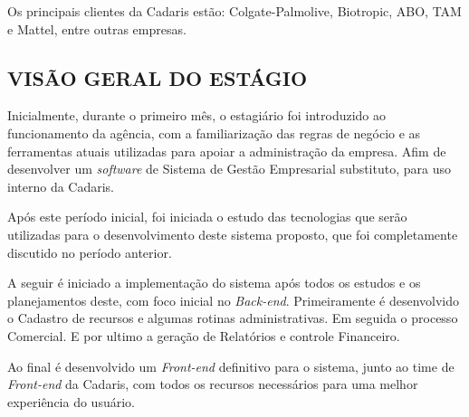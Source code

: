 \documentclass[
  12pt,				%
  openany,
  oneside,
  a4paper,			%
  english,			%
  brazil
]{article}
\numberwithin{figure}{section}
\numberwithin{table}{section}
\begin{document}
Os principais clientes da Cadaris estão: Colgate-Palmolive, Biotropic, ABO, TAM e Mattel, entre outras empresas.



\subsection{VISÃO GERAL DO ESTÁGIO}


Inicialmente, durante o primeiro mês, o estagiário foi introduzido ao funcionamento da agência, com a familiarização das regras de negócio e as ferramentas atuais utilizadas para apoiar a administração da empresa. Afim de desenvolver um \textit{software} de Sistema de Gestão Empresarial substituto, para uso interno da Cadaris.

Após este período inicial, foi iniciada o estudo das tecnologias que serão utilizadas para o desenvolvimento deste sistema proposto, que foi completamente discutido no período anterior.

A seguir é iniciado a implementação do sistema após todos os estudos e os planejamentos deste, com foco inicial no \textit{Back-end}. Primeiramente é desenvolvido o Cadastro de recursos e algumas rotinas administrativas. Em seguida o processo Comercial. E por ultimo a geração de Relatórios e controle Financeiro.

Ao final é desenvolvido um \textit{Front-end} definitivo para o sistema, junto ao time de \textit{Front-end} da Cadaris, com todos os recursos necessários para uma melhor experiência do usuário.


\end{document}
